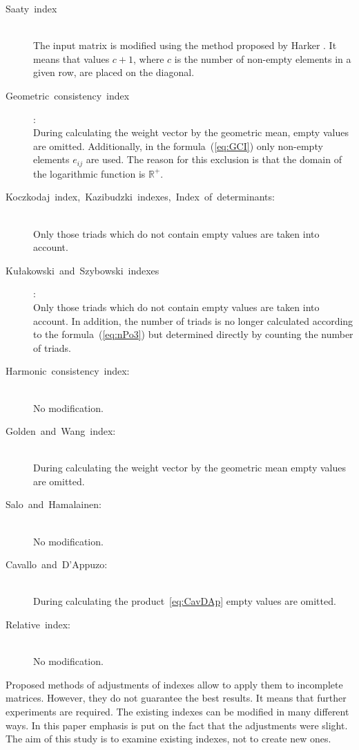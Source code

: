 \begin{description}

\item[Saaty index] \hfill \\ 
	The input matrix is modified using the method proposed by Harker \cite{HARKER1987}. It means that values $c+1$, where $c$ is the number of non-empty elements in a given row, are placed on the diagonal.

\item[Geometric consistency index]: \hfill \\
	During calculating the weight vector by the geometric mean, empty values are omitted. Additionally, in the formula~(\ref{eq:GCI}) only non-empty elements $e_{ij}$ are used. The reason for this exclusion is that the domain of the logarithmic function is $\mathbb{R}^{+}$.

\item[Koczkodaj index, Kazibudzki indexes, Index of determinants:] \hfill \\ 
  Only those triads which do not contain empty values are taken into account.

\item[Kułakowski and Szybowski indexes]: \hfill \\ 
	Only those triads which do not contain empty values are taken into account. In addition, the number of triads is no longer calculated according to the formula~(\ref{eq:nPo3}) but determined directly by counting the number of triads.

\item[Harmonic consistency index:] \hfill \\ 
  No modification.

\item[Golden and Wang index:] \hfill \\ 
  During calculating the weight vector by the geometric mean empty values are omitted.

\item[Salo and Hamalainen:] \hfill \\ 
  No modification.

\item[Cavallo and D'Appuzo:] \hfill \\
	During calculating the product~\ref{eq:CavDAp} empty values are omitted.

\item[Relative index:] \hfill \\ 
  No modification.
\end{description}

Proposed methods of adjustments of indexes allow to apply them to incomplete matrices. However, they do not guarantee the best results. It means that further experiments are required. The existing indexes can be modified in many different ways. In this paper emphasis is put on the fact that the adjustments were slight. The aim of this study is to examine existing indexes, not to create new ones.